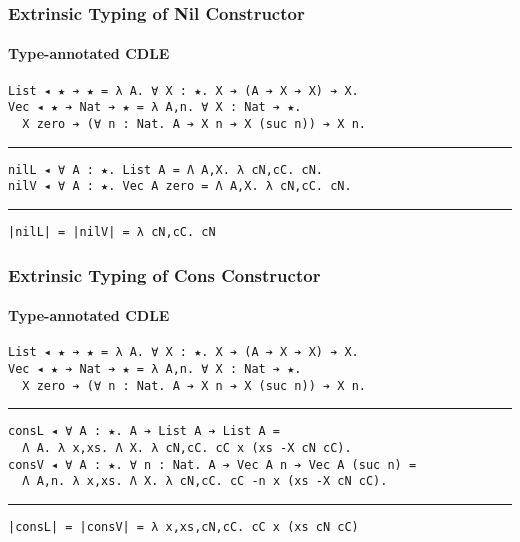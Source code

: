 \documentclass[mathserif,usenames,dvipsnames]{beamer}
\begin{document}
\begin{frame}[fragile]
\frametitle{Extrinsic Typing of Nil Constructor}
\framesubtitle{Type-annotated CDLE}

\begin{verbatim}
List ◂ ★ ➔ ★ = λ A. ∀ X : ★. X ➔ (A ➔ X ➔ X) ➔ X.
Vec ◂ ★ ➔ Nat ➔ ★ = λ A,n. ∀ X : Nat ➔ ★.
  X zero ➔ (∀ n : Nat. A ➔ X n ➔ X (suc n)) ➔ X n.
\end{verbatim}

\noindent\rule{\textwidth}{1pt}

\begin{verbatim}
nilL ◂ ∀ A : ★. List A = Λ A,X. λ cN,cC. cN.
nilV ◂ ∀ A : ★. Vec A zero = Λ A,X. λ cN,cC. cN.
\end{verbatim}

\noindent\rule{\textwidth}{1pt}

\begin{verbatim}
|nilL| = |nilV| = λ cN,cC. cN
\end{verbatim}

\end{frame}

\begin{frame}[fragile]
\frametitle{Extrinsic Typing of Cons Constructor}
\framesubtitle{Type-annotated CDLE}

\begin{verbatim}
List ◂ ★ ➔ ★ = λ A. ∀ X : ★. X ➔ (A ➔ X ➔ X) ➔ X.
Vec ◂ ★ ➔ Nat ➔ ★ = λ A,n. ∀ X : Nat ➔ ★.
  X zero ➔ (∀ n : Nat. A ➔ X n ➔ X (suc n)) ➔ X n.
\end{verbatim}

\noindent\rule{\textwidth}{1pt}

\begin{verbatim}
consL ◂ ∀ A : ★. A ➔ List A ➔ List A =
  Λ A. λ x,xs. Λ X. λ cN,cC. cC x (xs -X cN cC).
consV ◂ ∀ A : ★. ∀ n : Nat. A ➔ Vec A n ➔ Vec A (suc n) =
  Λ A,n. λ x,xs. Λ X. λ cN,cC. cC -n x (xs -X cN cC).
\end{verbatim}

\noindent\rule{\textwidth}{1pt}

\begin{verbatim}
|consL| = |consV| = λ x,xs,cN,cC. cC x (xs cN cC)
\end{verbatim}

\end{frame}
\end{document}
